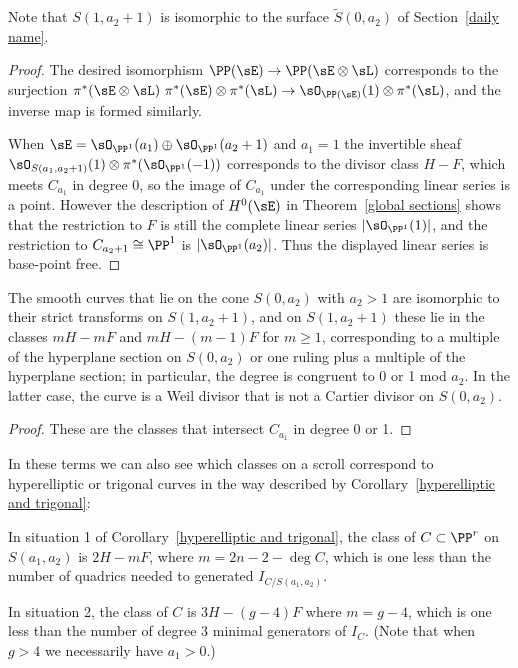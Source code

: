 Note that $S(1,a_2+1)$ is isomorphic to the surface $\tilde S(0, a_2)$ of Section~\ref{daily name}.

\begin{proof} 
The desired isomorphism $\PP(\sE) \to \PP(\sE\otimes \sL)$ corresponds to the surjection 
$\pi^*(\sE \otimes\sL) \ \pi^*(\sE) \otimes \pi^*(\sL) \to \sO_{\PP(\sE)}(1) \otimes \pi^*(\sL)$, 
and the inverse map is formed similarly.

When $\sE = \sO_{\PP^1}(a_1)\oplus \sO_{\PP^1}(a_2+1)$ and $a_1 = 1$ the
invertible sheaf
$\sO_{S(a_1, a_{2}+1)}(1) \otimes \pi^{*}(\sO_{\PP^{1}}(-1))$ corresponds to the divisor class $H-F$, which meets $C_{a_1}$  in degree 0, so the image
of $C_{a_1}$ under the corresponding linear series is a point. However the description of  $H^0(\sE)$ in
Theorem~\ref{global sections} shows that the restriction to $F$
is still the complete linear series $|\sO_{\PP^1}(1)|$, and the restriction to $C_{{a_2}+1}\cong \PP^1$
is $|\sO_{\PP^1}(a_2)|$. Thus the displayed linear series is base-point free.
\end{proof}

\begin{corollary}\label{curves on a singular scroll}
 The smooth curves that lie on the cone $S(0,a_2)$ with $a_2>1$ are isomorphic to their strict transforms
 on $S(1,a_2+1)$, and on $S(1,a_2+1)$ these lie in the classes $mH-mF$ and $mH-(m-1)F$ for $m\geq 1$, 
 corresponding to a multiple of the hyperplane section on $S(0,a_2)$ or one ruling plus a multiple of the hyperplane section;
 in particular, the degree is congruent to 0 or 1 mod $a_2$. 
 In the latter case, the curve is a Weil divisor that is not a Cartier divisor on $S(0,a_2)$.
\end{corollary}

\begin{proof}
These are the classes that intersect $C_{a_1}$ in degree 0 or 1.
\end{proof}


In these terms we can also see which classes on a scroll correspond to hyperelliptic or trigonal curves in the way described by Corollary~\ref{hyperelliptic and trigonal}:

\begin{corollary}\label{which class}
In situation 1 of Corollary~\ref{hyperelliptic and trigonal}, the class of $C\subset \PP^r$ on $S(a_1,a_2)$ is
$2H - mF$, where $m =  2n-2 - \deg C$, which is one less than the number of quadrics needed to generated $I_{C/S(a_1,a_2)}$.

In situation 2, the class of $C$ is 
$3H -  (g-4)F$ where $m = g-4$, which is one less than the number of degree 3 minimal generators of $I_{C}.$
(Note that when $g>4$ we necessarily have $a_1 > 0$.) 
\end{corollary}


